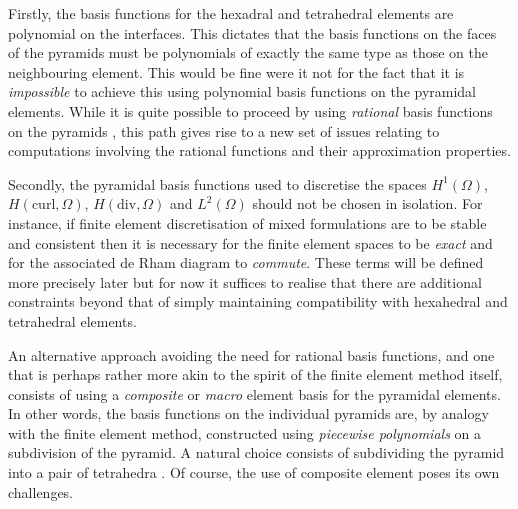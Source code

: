 \documentclass[twoside,reqno,final]{amsart}
\begin{document}
Firstly, the basis functions for the hexadral and tetrahedral elements are
polynomial on the interfaces. This dictates that the basis functions on the
faces of the pyramids must be polynomials of exactly the same type as those on
the neighbouring element. This would be fine were it not for the fact that it
is \emph{impossible} to achieve this using polynomial basis functions on the
pyramidal elements. While it is quite possible to proceed by using
\emph{rational} basis functions on the pyramids
\cite{Bedrosian92,GradinaruHiptmair99,Sherwin97,SherwinWarburtonKarniadakis98,Warburton00,NigamPhillips12,NigamPhillips12b,BergotCohenDurufle10,BergotDurufle13a,BergotDurufle13b,BergotDurufle13c,FuentesKeithDemkowiczNagaraj15,ChanWarburton15,ChanWarburton16,Gillette16,CockburnFuCommuting},
this path gives rise to a new set of issues relating to computations involving
the rational functions and their approximation properties. 

Secondly, the pyramidal basis functions used to discretise the spaces
$H^1(\Omega)$, $H(\mathrm{curl},\Omega)$, $H(\mathrm{div},\Omega)$ and
$L^2(\Omega)$ should not be chosen in isolation. For instance, if finite
element discretisation of mixed formulations are to be stable and consistent
then it is necessary for the finite element spaces to be \emph{exact} and for
the associated de Rham diagram to \emph{commute}. These terms will be defined
more precisely later but for now it suffices to realise that there are
additional constraints beyond that of simply maintaining compatibility with
hexahedral and tetrahedral elements. 

An alternative approach avoiding the need for rational basis functions, and one
that is perhaps rather more akin to the spirit of the finite element method
itself, consists of using a \emph{composite} or \emph{macro} element basis for
the pyramidal elements. In other words, the basis functions on the individual
pyramids are, by analogy with the finite element method, constructed using
\emph{piecewise polynomials} on a subdivision of the pyramid. A natural choice
consists of subdividing the pyramid into a pair of tetrahedra
\cite{Wieners97,KnabnerSumm01,BluckWalker08,LiuDaviesYuanKvrivzek04,LiuDaviesKrivzekGuan11,AinsworthDavydovSchumaker16}. Of course, the use of composite 
element poses its own challenges. 
\end{document}

